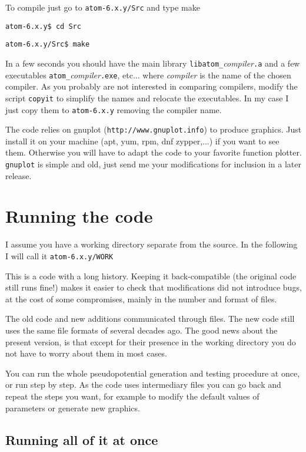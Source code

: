 \documentclass[11pt]{article}
\begin{document}
To compile just go to \texttt{atom-6.x.y/Src} and type make

\noindent\texttt{atom-6.x.y\$ cd Src}

\noindent\texttt{atom-6.x.y/Src\$ make}

In a few seconds you should have the main library \texttt{libatom{\_}}\textit{compiler}\texttt{.a}
and a few executables \texttt{atom{\_}}\textit{compiler}\texttt{.exe}, etc...
where \textit{compiler} is the name of the chosen compiler.
As you probably are not interested in comparing compilers, modify
the script \texttt{copyit} to simplify the names and relocate the executables.  In my case
I just copy them to \texttt{atom-6.x.y} removing the compiler name.

The code relies on gnuplot (\texttt{http://www.gnuplot.info}) to produce graphics.  Just install it
on your machine (apt, yum, rpm, dnf zypper,...) if you want to see them.  Otherwise you will
have to adapt the code to your favorite function plotter.  \texttt{gnuplot} is simple and old,
just send me your modifications for inclusion in a later release.




\section{Running the code}
\label{sec:run}

I assume you have a working directory separate from the source.  In the following I will call it
\texttt{atom-6.x.y/WORK}

This is a code with a long history.  Keeping it back-compatible (the original code still runs fine!)
makes it easier to check that modifications did not introduce bugs, at the cost of some compromises,
mainly in the number and format of files.

The old code and new additions communicated through files.  The new code still uses the same file formats
of several decades ago.
The good news about the present version, is that except for their presence in the working directory
you do not have to worry about them in most cases.

You can run the whole pseudopotential generation and testing procedure at once, or run step by step.
As the code uses intermediary files you can go back and repeat the steps you want, for example
to modify the default values of parameters or generate new graphics.


\subsection{Running all of it at once}
\label{sec:run-all}
\end{document}
